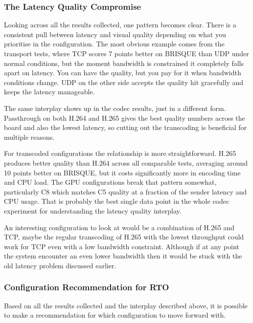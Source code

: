 \subsubsection{The Latency Quality Compromise}\label{subsubsec:latency_quality_tradeoff}

Looking across all the results collected, one pattern becomes clear. There is a consistent pull between latency and visual quality depending on what you prioritise in the configuration. The most obvious example comes from the transport tests, where TCP scores 7 points better on BRISQUE than UDP under normal conditions, but the moment bandwidth is constrained it completely falls apart on latency. You can have the quality, but you pay for it when bandwidth conditions change. UDP on the other side accepts the quality hit gracefully and keeps the latency manageable.

The same interplay shows up in the codec results, just in a different form. Passthrough on both H.264 and H.265 gives the best quality numbers across the board and also the lowest latency, so cutting out the transcoding is beneficial for multiple reasons.

For transcoded configurations the relationship is more straightforward. H.265 produces better quality than H.264 across all comparable tests, averaging around 10 points better on BRISQUE, but it costs significantly more in encoding time and CPU load. The GPU configurations break that pattern somewhat, particularly C8 which matches C5 quality at a fraction of the sender latency and CPU usage. That is probably the best single data point in the whole codec experiment for understanding the latency quality interplay.

An interesting configuration to look at would be a combination of H.265 and TCP, maybe the regular transcoding of H.265 with the lowest throughput could work for TCP even with a low bandwidth constraint. Although if at any point the system encounter an even lower bandwidth then it would be stuck with the old latency problem discussed earlier. 

\subsubsection{Configuration Recommendation for RTO}\label{subsubsec:recommendation}

Based on all the results collected and the interplay described above, it is possible to make a recommendation for which configuration to move forward with.

